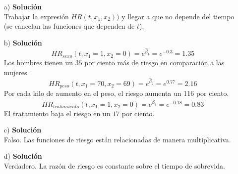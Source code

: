 \documentclass[10pt]{article}\usepackage[]{graphicx}\usepackage[]{color}
\begin{document}
{\begin{itemize}

\item[a)]  \textbf{Solución}\\ 
Trabajar la expresión $HR(t,x_{1},x_{2}))$ y llegar a que no depende del tiempo (se cancelan las funciones que dependen  de $t$).
\item[b)]  \textbf{Solución}\\ 
$$HR_{sexo}(t,x_{1}=1,x_{2}=0)=e^{\hat{\beta}_{1}}=e^{-0.3}=1.35$$
Los hombres tienen un $35$ por ciento más de riesgo en comparación a las mujeres.\\
$$HR_{peso}(t,x_{1}=70,x_{2}=69)=e^{\hat{\beta}_{2}}=e^{0.77}=2.16$$
Por cada kilo de aumento en el peso, el riesgo aumenta un 116 por ciento.\\
$$HR_{tratamiento}(t,x_{1}=1,x_{2}=0)=e^{\hat{\beta}_{3}}=e^{-0.18}=0.83$$
El tratamiento baja el riesgo en un $17$ por ciento.

\item[c)] \textbf{Solución}\\ 
Falso. Las funciones de riesgo están relacionadas de manera multiplicativa.
\item[d)] \textbf{Solución}\\ 
Verdadero. La razón de riesgo es constante sobre el tiempo de sobrevida.  

\end{itemize}

}
\end{document}
